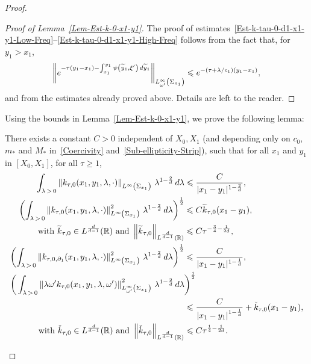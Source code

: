 \documentclass[AHL,Unicode,longabstracts]{cedram}
\newcommand*\R{\mathbb{R}}
\newcommand{\norm}[1]{\left\Vert#1\right\Vert}
\renewcommand{\leq}{\leqslant}
\renewcommand{\geq}{\geqslant}
\renewcommand{\tilde}{\widetilde}
\let\oldtilde\tilde
\renewcommand*{\tilde}[1]{\mathchoice{\widetilde{#1}}{\widetilde{#1}}{\oldtilde{#1}}{\oldtilde{#1}}}
\begin{document}
\begin{proof}
\begin{proof}[Proof of Lemma~\ref{Lem-Est-k-0-x1-y1}]
The proof of estimates~\eqref{Est-k-tau-0-d1-x1-y1-Low-Freq}--\eqref{Est-k-tau-0-d1-x1-y1-High-Freq} follows from the fact that, for $y_1 > x_1$,
\[
\left\| e^{-\tau(y_1-x_1) - \int_{x_1}^{y_1} \psi\left(\tilde y_1, \xi'\right) \, d\tilde y_1}\right\|_{L^\infty_{\omega'}\left(\Sigma_{x_1}\right)}
\leq e^{-(\tau +\lambda/c_1) (y_1 - x_1)},
\]
and from the estimates already proved above. Details are left to the reader.
\end{proof}

Using the bounds in Lemma~\ref{Lem-Est-k-0-x1-y1}, we prove the following lemma:

\begin{lemm}\label{Lem-Est-k0-x1-y1-integratednorms}
There exists a constant $C >0$ independent of $X_0, X_1$ (and depending only on $c_0$, $m_*$ and $M_*$ in~\eqref{Coercivity} and~\eqref{Sub-ellipticity-Strip}), such that for all $x_1$ and $y_1$ in $[X_0, X_1]$, for all $\tau \geq 1$,
\begin{align}
\int_{\lambda\,>\,0} \norm{k_{\tau,0}(x_1, y_1, \lambda, \cdot) }_{L^\infty\left(\Sigma_{x_1}\right)} \, \lambda^{1 -\frac{2}{d}}\, d\lambda
&\leq
\frac{C}{|x_1 - y_1|^{1-\frac{2}{d}}},\label{est-k0-x1-y1-Lp-Lp'}
\\
\left(\int_{\lambda\,>\,0} \norm{k_{\tau,0}(x_1, y_1, \lambda, \cdot) }^2_{L^\infty\left(\Sigma_{x_1}\right)} \, \lambda^{1 -\frac{2}{d}}\, d\lambda\right)^{\frac{1}{2}}
&\leq C \tilde k_{\tau,0}(x_1-y_1),\label{est-k0-x1-y1-Lp-L2}
\\
\text{ with }\tilde k_{\tau,0} \in L^{\frac{d}{d-1}} (\R)\text{ and }
\left\|\tilde k_{\tau,0}\right\|_{L^{\frac{d}{d-1}} (\R)} &\leq C \tau^{-\frac{3}{4}-\frac{1}{2d}},
\notag
\\
\left(
\int_{\lambda\,>\,0} \norm{ k_{\tau,0, \partial_1 }(x_1, y_1, \lambda, \cdot) }^2_{L^\infty\left(\Sigma_{x_1}\right)} \, \lambda^{1 -\frac{2}{d}}\, d\lambda
\right)^{\frac{1}{2}}
&\leq
\frac{C}{|x_1 - y_1|^{1-\frac{1}{d}} },\label{est-k0-d1-x1-y1-Lp-L2}
\\
\bigg(\int_{\lambda\,>\,0} \norm{\lambda \omega' k_{\tau,0}(x_1, y_1, \lambda, \omega') }^2_{L^\infty_{\omega'}\left(\Sigma_{x_1}\right)} \, \lambda^{1 -\frac{2}{d}}\, d\lambda&\bigg)^{\frac{1}{2}}\label{est-k0-x1-y1-Lp-nabla'-L2}\\
&\leq
\frac{C}{\left|x_1 - y_1\right|^{1-\frac{1}{d}}} + \check k_{\tau,0}(x_1 -y_1),\nonumber
\\
\text{ with }\check k_{\tau,0} \in L^{\frac{d}{d-1}} (\R)\text{ and }
\left\|\check k_{\tau,0}\right\|_{L^{\frac{d}{d-1}} (\R)} &\leq C \tau^{\frac{1}{4}-\frac{1}{2d}}.
\notag
\end{align}
\end{lemm}


\end{proof}
\end{document}
